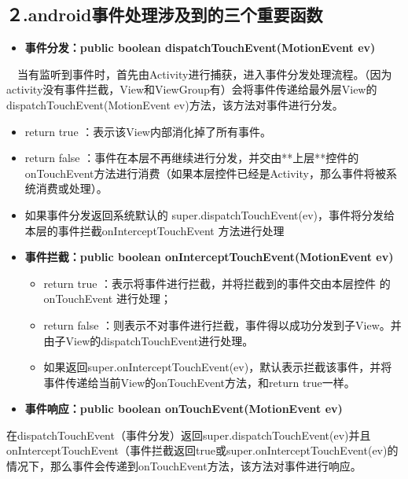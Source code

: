 \documentclass[9pt, b5paper]{article}
\begin{document}
\subsection{２.android事件处理涉及到的三个重要函数}
\label{sec-12-2}
\begin{itemize}
\item \textbf{\textbf{事件分发：public boolean dispatchTouchEvent(MotionEvent ev)}}
\end{itemize}
　当有监听到事件时，首先由Activity进行捕获，进入事件分发处理流程。（因为activity没有事件拦截，View和ViewGroup有）会将事件传递给最外层View的dispatchTouchEvent(MotionEvent ev)方法，该方法对事件进行分发。
\begin{itemize}
\item return true  ：表示该View内部消化掉了所有事件。

\item return false  ：事件在本层不再继续进行分发，并交由**上层**控件的onTouchEvent方法进行消费（如果本层控件已经是Activity，那么事件将被系统消费或处理）。　

\item 如果事件分发返回系统默认的 super.dispatchTouchEvent(ev)，事件将分发给本层的事件拦截onInterceptTouchEvent 方法进行处理
\item \textbf{\textbf{事件拦截：public boolean onInterceptTouchEvent(MotionEvent ev)}}
\begin{itemize}
\item return true  ：表示将事件进行拦截，并将拦截到的事件交由本层控件 的 onTouchEvent 进行处理；

\item return false  ：则表示不对事件进行拦截，事件得以成功分发到子View。并由子View的dispatchTouchEvent进行处理。　

\item 如果返回super.onInterceptTouchEvent(ev)，默认表示拦截该事件，并将事件传递给当前View的onTouchEvent方法，和return true一样。
\end{itemize}
\item \textbf{\textbf{事件响应：public boolean onTouchEvent(MotionEvent ev)}}
\end{itemize}
在dispatchTouchEvent（事件分发）返回super.dispatchTouchEvent(ev)并且onInterceptTouchEvent（事件拦截返回true或super.onInterceptTouchEvent(ev)的情况下，那么事件会传递到onTouchEvent方法，该方法对事件进行响应。
　
\end{document}
